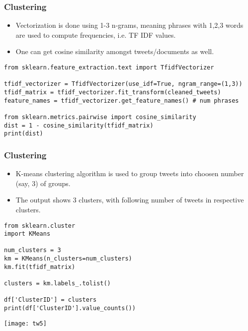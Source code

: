 \begin{frame}[fragile]\frametitle{Clustering}
  \begin{itemize}
  \item Vectorization is done using 1-3 n-grams, meaning phrases with 1,2,3 words are used to compute frequencies, i.e. TF IDF values.
  \item One can get cosine similarity amongst tweets/documents as well.
    \end{itemize}
  \begin{lstlisting}
from sklearn.feature_extraction.text import TfidfVectorizer  

tfidf_vectorizer = TfidfVectorizer(use_idf=True, ngram_range=(1,3))  
tfidf_matrix = tfidf_vectorizer.fit_transform(cleaned_tweets)  
feature_names = tfidf_vectorizer.get_feature_names() # num phrases  

from sklearn.metrics.pairwise import cosine_similarity  
dist = 1 - cosine_similarity(tfidf_matrix)  
print(dist) 
  \end{lstlisting}
\end{frame}

\begin{frame}[fragile]\frametitle{Clustering}
  \begin{itemize}
  \item K-means clustering algorithm is used to group tweets into choosen number (say, 3) of groups.
\item The output shows 3 clusters, with following number of tweets in respective clusters.
    \end{itemize}
  \begin{lstlisting}
from sklearn.cluster 
import KMeans  

num_clusters = 3  
km = KMeans(n_clusters=num_clusters)  
km.fit(tfidf_matrix)  

clusters = km.labels_.tolist()  

df['ClusterID'] = clusters  
print(df['ClusterID'].value_counts())
  \end{lstlisting}
    \begin{center}
\texttt{[image: tw5]}
\end{center}
\end{frame}

